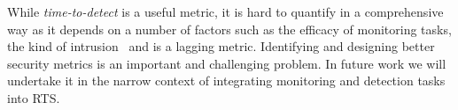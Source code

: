\documentclass[../rt_server_main.tex]{subfiles}
\begin{document}
While \textit{time-to-detect} is a useful metric, it is hard to quantify in a
comprehensive way as it depends on a number of factors such as the efficacy
of monitoring tasks, the kind of intrusion \etc~and is a lagging metric.
Identifying and designing better security metrics is an important and
challenging problem. In future work we will undertake it in the narrow context of
integrating monitoring and detection tasks into RTS. 

 
\end{document}
